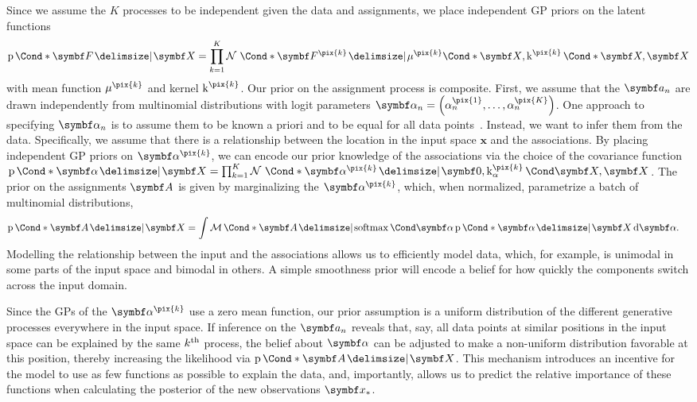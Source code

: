 Since we assume the $K$ processes to be independent given the data and assignments, we place independent GP priors on the latent functions
\begin{equation}
    \begin{split}
        \Prob*{\mat{F} \given \mat{X}} = \prod_{k=1}^K \Gaussian*{\mat{F}^{\pix{k}} \given \Fun*{\mu^{\pix{k}}}{\mat{X}}, \Fun*{\K^{\pix{k}}}{\mat{X}, \mat{X}}}
    \end{split}
\end{equation}
with mean function $\mu^{\pix{k}}$ and kernel $\K^{\pix{k}}$.
Our prior on the assignment process is composite.
First, we assume that the $\mat{a}_n$ are drawn independently from multinomial distributions with logit parameters $\mat{\alpha}_n = \left( \alpha_n^{\pix{1}}, \ldots, \alpha_n^{\pix{K}} \right)$.
One approach to specifying $\mat{\alpha}_n$ is to assume them to be known a priori and to be equal for all data points~\parencite{lazaro-gredilla_overlapping_2012}.
Instead, we want to infer them from the data.
Specifically, we assume that there is a relationship between the location in the input space $\mathbf{x}$ and the associations.
By placing independent GP priors on $\mat{\alpha}^{\pix{k}}$, we can encode our prior knowledge of the associations via the choice of the covariance function $\Prob*{\mat{\alpha} \given \mat{X}} = \prod_{k=1}^K \Gaussian*{\rv{\alpha}^{\pix{k}} \given \mat{0}, \Fun{\K_\alpha^{\pix{k}}}{\mat{X}, \mat{X}}}$.
The prior on the assignments $\mat{A}$ is given by marginalizing the $\mat{\alpha}^{\pix{k}}$, which, when normalized, parametrize a batch of multinomial distributions,
\begin{equation}
    \begin{split}
        \label{eq:data_association:multinomial_likelihood}
        \Prob*{\mat{A} \given \mat{X}} &=
        \int
        \Multinomial*{\mat{A} \given \Fun{\softmax}{\mat{\alpha}}} \Prob*{\mat{\alpha} \given \mat{X}}
        \diff \rv{\alpha}.
    \end{split}
\end{equation}
Modelling the relationship between the input and the associations allows us to efficiently model data, which, for example, is unimodal in some parts of the input space and bimodal in others.
A simple smoothness prior will encode a belief for how quickly the components switch across the input domain.

Since the GPs of the $\mat{\alpha}^{\pix{k}}$ use a zero mean function, our prior assumption is a uniform distribution of the different generative processes everywhere in the input space.
If inference on the $\mat{a}_n$ reveals that, say, all data points at similar positions in the input space can be explained by the same $k^{\text{th}}$ process, the belief about $\mat{\alpha}$ can be adjusted to make a non-uniform distribution favorable at this position, thereby increasing the likelihood via $\Prob*{\mat{A} \given \mat{X}}$.
This mechanism introduces an incentive for the model to use as few functions as possible to explain the data, and, importantly, allows us to predict the relative importance of these functions when calculating the posterior of the new observations $\mat{x}_\ast$.

